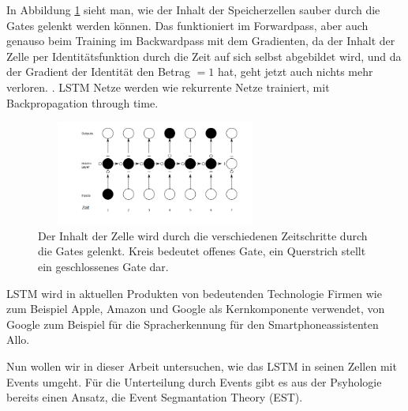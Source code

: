In Abbildung \ref{img:lstm2} sieht man, wie der Inhalt der Speicherzellen sauber durch die Gates gelenkt werden können. Das funktioniert im Forwardpass, aber auch genauso beim Training im Backwardpass mit dem Gradienten, da der Inhalt der Zelle per Identitätsfunktion durch die Zeit auf sich selbst abgebildet wird, und da der Gradient der Identität den Betrag \( = 1 \) hat, geht jetzt auch nichts mehr verloren. \cite{bib:lstm}. LSTM Netze werden wie rekurrente Netze trainiert, mit Backpropagation through time.
\begin{figure}
	\centering
	\includegraphics[width=0.7\textwidth, height=130px]{pics/lstm2.png}	
	\caption{Der Inhalt der Zelle wird durch die verschiedenen Zeitschritte durch die Gates gelenkt. Kreis bedeutet offenes Gate, ein Querstrich stellt ein geschlossenes Gate dar.    \cite{bib:lstm}}
	\label{img:lstm2}
\end{figure}

LSTM wird in aktuellen Produkten von bedeutenden Technologie Firmen wie zum Beispiel Apple\cite{bib:apple}, Amazon\cite{bib:amazon} und Google als Kernkomponente verwendet, von Google zum Beispiel für die Spracherkennung für den Smartphoneassistenten Allo\cite{bib:allo}. 

Nun wollen wir in dieser Arbeit untersuchen, wie das LSTM in seinen Zellen mit Events umgeht. Für die Unterteilung durch Events gibt es aus der Psyhologie bereits einen Ansatz, die Event Segmantation Theory (EST).

